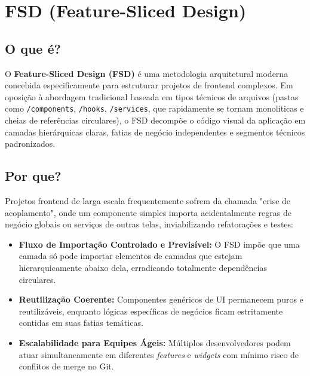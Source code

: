 \documentclass[12pt,a4paper]{article}
\begin{document}
\section{FSD (Feature-Sliced Design)}

\subsection{O que é?}
O \textbf{Feature-Sliced Design (FSD)} é uma metodologia arquitetural moderna concebida especificamente para estruturar projetos de frontend complexos. Em oposição à abordagem tradicional baseada em tipos técnicos de arquivos (pastas como \texttt{/components}, \texttt{/hooks}, \texttt{/services}, que rapidamente se tornam monolíticas e cheias de referências circulares), o FSD decompõe o código visual da aplicação em camadas hierárquicas claras, fatias de negócio independentes e segmentos técnicos padronizados.

\subsection{Por que?}
Projetos frontend de larga escala frequentemente sofrem da chamada "crise de acoplamento", onde um componente simples importa acidentalmente regras de negócio globais ou serviços de outras telas, inviabilizando refatorações e testes:
\begin{itemize}
  \item \textbf{Fluxo de Importação Controlado e Previsível:} O FSD impõe que uma camada só pode importar elementos de camadas que estejam hierarquicamente abaixo dela, erradicando totalmente dependências circulares.
  \item \textbf{Reutilização Coerente:} Componentes genéricos de UI permanecem puros e reutilizáveis, enquanto lógicas específicas de negócios ficam estritamente contidas em suas fatias temáticas.
  \item \textbf{Escalabilidade para Equipes Ágeis:} Múltiplos desenvolvedores podem atuar simultaneamente em diferentes \textit{features} e \textit{widgets} com mínimo risco de conflitos de merge no Git.
\end{itemize}
\end{document}
